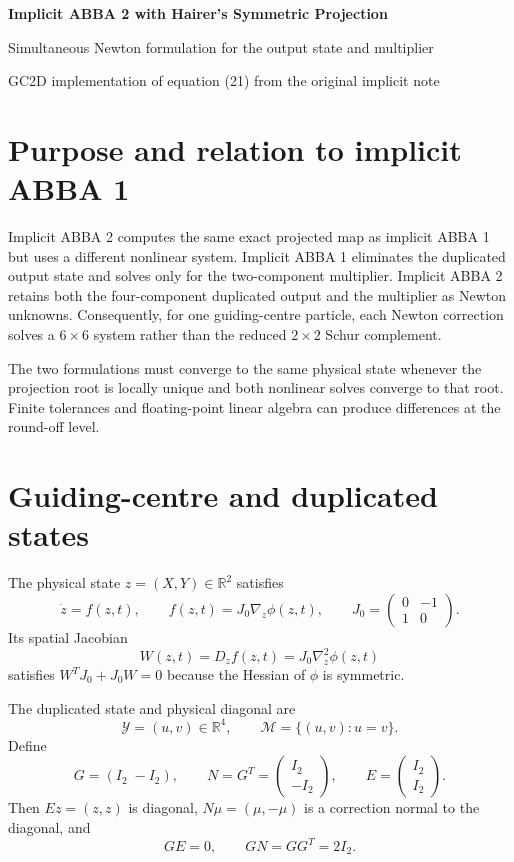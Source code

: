 \documentclass[11pt,a4paper]{article}
\newcommand{\R}{\mathbb{R}}
\newcommand{\Id}{I}
\newcommand{\Y}{\mathcal{Y}}
\newcommand{\M}{\mathcal{M}}
\begin{document}
\begin{center}
  {\LARGE\bfseries\color{blue}Implicit ABBA 2 with Hairer's Symmetric Projection}\par
  \vspace{0.35em}
  {\large Simultaneous Newton formulation for the output state and multiplier}\par
  \vspace{0.45em}
  {\small GC2D implementation of equation (21) from the original implicit note}
\end{center}

\vspace{0.5em}

\section{Purpose and relation to implicit ABBA 1}

Implicit ABBA 2 computes the same exact projected map as implicit ABBA 1 but
uses a different nonlinear system. Implicit ABBA 1 eliminates the duplicated
output state and solves only for the two-component multiplier. Implicit ABBA 2
retains both the four-component duplicated output and the multiplier as Newton
unknowns. Consequently, for one guiding-centre particle, each Newton correction
solves a $6\times6$ system rather than the reduced $2\times2$ Schur complement.

The two formulations must converge to the same physical state whenever the
projection root is locally unique and both nonlinear solves converge to that root.
Finite tolerances and floating-point linear algebra can produce differences at the
round-off level.

\section{Guiding-centre and duplicated states}

The physical state $z=(X,Y)\in\R^2$ satisfies
\[
 \dot z=f(z,t),
 \qquad
 f(z,t)=J_0\nabla_z\phi(z,t),
 \qquad
 J_0=
 \begin{pmatrix}
  0&-1\\
  1&0
 \end{pmatrix}.
\]
Its spatial Jacobian
\[
 W(z,t)=D_zf(z,t)=J_0\nabla_z^2\phi(z,t)
\]
satisfies $W^TJ_0+J_0W=0$ because the Hessian of $\phi$ is symmetric.

The duplicated state and physical diagonal are
\[
 \Y=(u,v)\in\R^4,
 \qquad
 \M=\{(u,v):u=v\}.
\]
Define
\[
 G=(\Id_2\;-\Id_2),
 \qquad
 N=G^T=
 \begin{pmatrix}\Id_2\\-\Id_2\end{pmatrix},
 \qquad
 E=
 \begin{pmatrix}\Id_2\\\Id_2\end{pmatrix}.
\]
Then $Ez=(z,z)$ is diagonal, $N\mu=(\mu,-\mu)$ is a correction
normal to the diagonal, and
\[
 GE=0,
 \qquad
 GN=GG^T=2\Id_2.
\]
\end{document}
